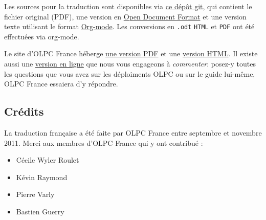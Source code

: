 \documentclass[11pt]{article}
\begin{document}
Les sources pour la traduction sont disponibles via \href{https://github.com/bzg/OLPC-Deployment--community--guide}{ce dépôt git}, qui
contient le fichier original (PDF), une version en \href{http://fr.wikipedia.org/wiki/OpenDocument}{Open Document Format} et
une version texte utilisant le format \href{http://orgmode.org}{Org-mode}.  Les conversions en \texttt{.odt}
\texttt{HTML} et \texttt{PDF} ont été effectuées via org-mode.

Le site d'OLPC France héberge \href{http://olpc-france.org/guide-deploiement/olpc-guide-deploiement.pdf}{une version PDF} et une \href{http://olpc-france.org/guide-deploiement/olpc-guide-deploiement.html}{version HTML}.  Il
existe aussi une \href{http://olpc-france.org/guide-deploiement/index.html}{version en ligne} que nous vous engageons à \emph{commenter}:
posez-y toutes les questions que vous avez sur les déploiments OLPC ou 
sur le guide lui-même, OLPC France essaiera d'y répondre.
\subsection{Crédits}
\label{sec-13-3}


La traduction française a été faite par OLPC France entre septembre et
novembre 2011.  Merci aux membres d'OLPC France qui y ont contribué :

\begin{itemize}
\item Cécile Wyler Roulet
\item Kévin Raymond
\item Pierre Varly
\item Bastien Guerry
\end{itemize}
\end{document}

